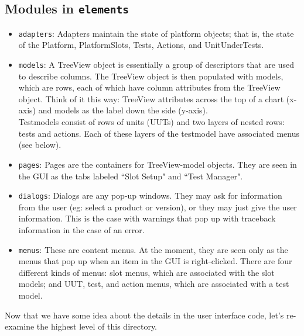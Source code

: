 \documentclass{report}
\begin{document}
\subsection{Modules in \texttt{elements}}

\begin{itemize}
	\item\texttt{adapters}: Adapters maintain the state of platform objects; that is, the state of the Platform, PlatformSlots, Tests, Actions, and UnitUnderTests.
	\item\texttt{models}: A TreeView object is essentially a group of descriptors that are used to describe columns. The TreeView object is then populated with models, which are rows, each of which have column attributes from the TreeView object. Think of it this way: TreeView attributes across the top of a chart (x-axis) and models as the label down the side (y-axis).\\
	Testmodels consist of rows of units (UUTs) and two layers of nested rows: tests and actions. Each of these layers of the testmodel have associated menus (see below).
	\item\texttt{pages}: Pages are the containers for TreeView-model objects. They are seen in the GUI as the tabs labeled ``Slot Setup" and ``Test Manager".
	\item\texttt{dialogs}: Dialogs are any pop-up windows. They may ask for information from the user (eg: select a product or version), or they may just give the user information. This is the case with warnings that pop up with traceback information in the case of an error.
	\item\texttt{menus}: These are content menus. At the moment, they are seen only as the menus that pop up when an item in the GUI is right-clicked. There are four different kinds of menus: slot menus, which are associated with the slot models; and UUT, test, and action menus, which are associated with a test model.
\end{itemize}

Now that we have some idea about the details in the user interface code, let's re-examine the highest level of this directory. %
\newpage

\end{document}
